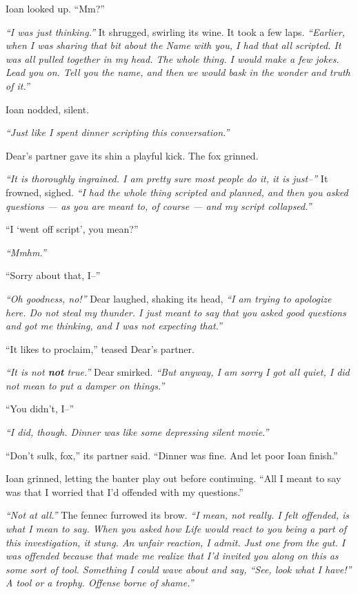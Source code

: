 Ioan looked up. ``Mm?''

\emph{``I was just thinking.''} It shrugged, swirling its wine. It took a few laps. \emph{``Earlier, when I was sharing that bit about the Name with you, I had that all scripted. It was all pulled together in my head. The whole thing. I would make a few jokes. Lead you on. Tell you the name, and then we would bask in the wonder and truth of it.''}

Ioan nodded, silent.

\emph{``Just like I spent dinner scripting this conversation.''}

Dear's partner gave its shin a playful kick. The fox grinned.

\emph{``It is thoroughly ingrained. I am pretty sure most people do it, it is just--''} It frowned, sighed. \emph{``I had the whole thing scripted and planned, and then you asked questions — as you are meant to, of course — and my script collapsed.''}

``I `went off script', you mean?''

\emph{``Mmhm.''}

``Sorry about that, I--''

\emph{``Oh goodness, no!''} Dear laughed, shaking its head, \emph{``I am trying to apologize here. Do not steal my thunder. I just meant to say that you asked good questions and got me thinking, and I was not expecting that.''}

``It likes to proclaim,'' teased Dear's partner.

\emph{``It is not \textbf{not} true.''} Dear smirked. \emph{``But anyway, I am sorry I got all quiet, I did not mean to put a damper on things.''}

``You didn't, I--''

\emph{``I did, though. Dinner was like some depressing silent movie.''}

``Don't sulk, fox,'' its partner said. ``Dinner was fine. And let poor Ioan finish.''

Ioan grinned, letting the banter play out before continuing. ``All I meant to say was that I worried that I'd offended with my questions.''

\emph{``Not at all.''} The fennec furrowed its brow. \emph{``I mean, not really. I felt offended, is what I mean to say. When you asked how Life would react to you being a part of this investigation, it stung. An unfair reaction, I admit. Just one from the gut. I was offended because that made me realize that I'd invited you along on this as some sort of tool. Something I could wave about and say, ``See, look what I have!'' A tool or a trophy. Offense borne of shame.''}

